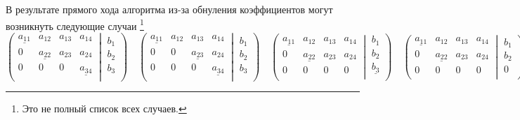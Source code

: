 В результате прямого хода алгоритма из-за обнуления коэффициентов могут возникнуть следующие случаи%
\footnote{Это не полный список всех случаев.}
\[
\left(\left.
\begin{matrix}
\underline{a_{11}}& a_{12}&a_{13}& a_{14}\\
0& \underline{a_{22}}&a_{23}& a_{24}\\
0& 0&0& \underline{a_{34}}\\
\end{matrix}
\:\right|\:
\begin{matrix}
b_1\\
b_2\\
b_3\\
\end{matrix}
\right)
\quad
\left(\left.
\begin{matrix}
\underline{a_{11}}& a_{12}&a_{13}& a_{14}\\
0& 0&\underline{a_{23}}& a_{24}\\
0& 0&0& \underline{a_{34}}\\
\end{matrix}
\:\right|\:
\begin{matrix}
b_1\\
b_2\\
b_3\\
\end{matrix}
\right)
\quad
\left(\left.
\begin{matrix}
\underline{a_{11}}& a_{12}&a_{13}& a_{14}\\
0& \underline{a_{22}}&a_{23}& a_{24}\\
0& 0&0& 0\\
\end{matrix}
\:\right|\:
\begin{matrix}
b_1\\
b_2\\
\underline{b_3}\\
\end{matrix}
\right)
\quad
\left(\left.
\begin{matrix}
\underline{a_{11}}& a_{12}&a_{13}& a_{14}\\
0& \underline{a_{22}}&a_{23}& a_{24}\\
0& 0&0& 0\\
\end{matrix}
\:\right|\:
\begin{matrix}
b_1\\
b_2\\
0\\
\end{matrix}
\right)
\]

